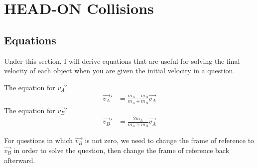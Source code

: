 \newpage
\section{HEAD-ON Collisions}
\subsection{Equations}
Under this section, I will derive equations that are useful for solving the final velocity of each object when you are given the initial velocity in a  question.

\begin{redblock}
    The equation for $\vec{v_A}'$
   \begin{align*}
    \vec{v_A}' &= \frac{m_A - m_B}{m_A + m_B}\vec{v_A}
   \end{align*}
   The equation for $\vec{v_B}'$
   \begin{align*}
    \vec{v_B}' &= \frac{2m_A}{m_A + m_B}\vec{v_A}
   \end{align*}
\end{redblock}

For questions in which $\vec{v_B}$ is not zero, we need to change the frame of reference to $\vec{v_B}$ in order to solve the question, then change the frame of reference back afterward. 
